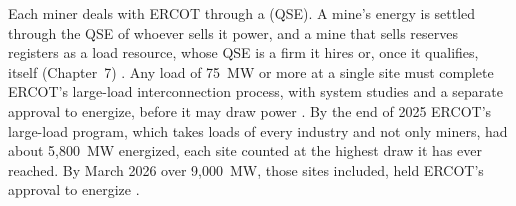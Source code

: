 Each miner deals with ERCOT through a  (QSE). A mine's energy is settled through the QSE of whoever sells it power, and a mine that sells reserves registers as a load resource, whose QSE is a firm it hires or, once it qualifies, itself (Chapter~7) \autocite{ercot2026protocols}. %
Any load of 75~MW or more at a single site must complete ERCOT's large-load interconnection process, with system studies and a separate approval to energize, before it may draw power \autocite{ercot2025nprr1234}. %
By the end of 2025 ERCOT's large-load program, which takes loads of every industry and not only miners, had about 5,800~MW energized, each site counted at the highest draw it has ever reached. By March 2026 over 9,000~MW, those sites included, held ERCOT's approval to energize \autocite{ercot2026llistatus}. %
